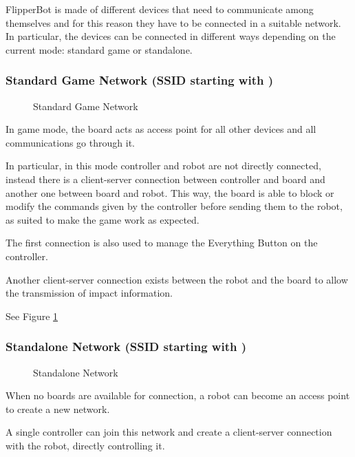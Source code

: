 
FlipperBot is made of different devices that need to communicate
among themselves and for this reason they have to be connected in a
suitable network. In particular, the devices can be connected in
different ways depending on the current mode: standard game or
standalone.

\subsubsection{Standard Game Network (SSID starting with
  )}
  \begin{figure}[htbp]
    \centering
    \resizebox{0.7\textwidth}{!}{}

    \caption{Standard Game Network}
    \label{fig:gamenet}
  \end{figure}
  In game mode, the board acts as access point for all other devices
  and all communications go through it.

  In particular, in this mode controller and robot are not directly
  connected, instead there is a client-server connection between
  controller and board and another one between board and robot. This
  way, the board is able to block or modify the commands given by
  the controller before sending them to the robot, as suited to make
  the game work as expected.

  The first connection is also used to manage the Everything Button
  on the controller.

  Another client-server connection exists between the robot and the
  board to allow the transmission of impact information.

  See Figure \ref{fig:gamenet}

\subsubsection{Standalone Network (SSID starting with
  )}
  \begin{figure}[htbp]
    \centering
    \resizebox{0.7\textwidth}{!}{}

    \caption{Standalone Network}
    \label{fig:robotnet}
  \end{figure}
  When no boards are available for connection, a robot can become an
  access point to create a new network.

  A single controller can join this network and create a
  client-server connection with the robot, directly controlling it.
  
